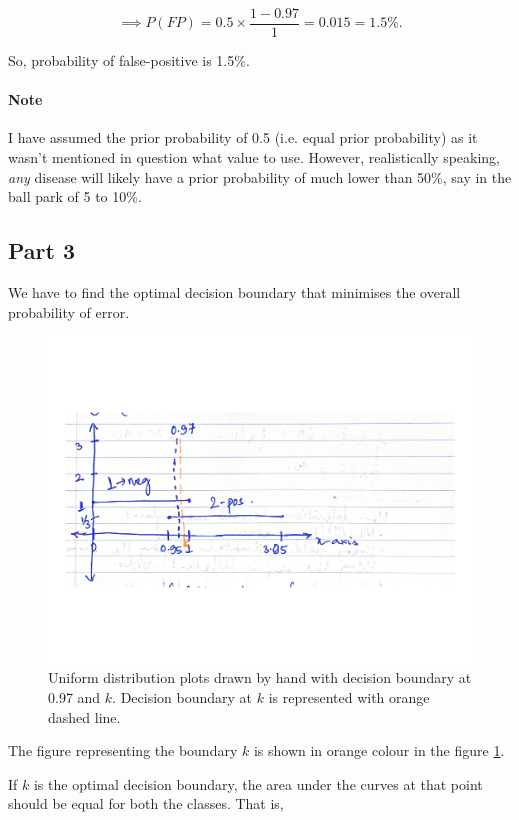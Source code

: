 \documentclass{article}
\begin{document}
$$
\implies P(FP) = 0.5 \times \frac{1-0.97}{1} = 0.015 = 1.5\%.
$$

So, probability of false-positive is 1.5\%.

\paragraph{Note} I have assumed the prior probability of 0.5 (i.e. equal prior probability) as it wasn't mentioned in question what value to use. However, realistically speaking, \textit{any} disease will likely have a prior probability of much lower than 50\%, say in the ball park of 5 to 10\%.


\subsection*{Part 3}

We have to find the optimal decision boundary that minimises the overall probability of error. 

\begin{figure}[H]
	\centering
    \includegraphics[width=\textwidth]{plot5.pdf}
    \caption{Uniform distribution plots drawn by hand with decision boundary at 0.97 and $k$. Decision boundary at $k$ is represented with orange dashed line.}
    \label{fig:plot5}
\end{figure}

The figure representing the boundary $k$ is shown in orange colour in the figure \ref{fig:plot5}. 

If $k$ is the optimal decision boundary, the area under the curves at that point should be equal for both the classes. That is,
\end{document}
